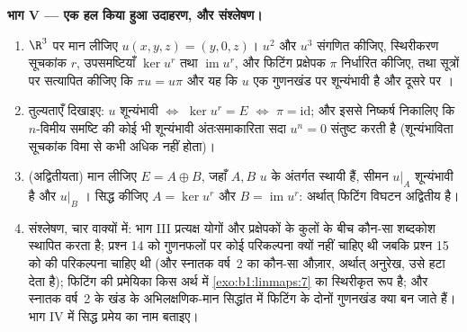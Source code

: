 \begin{problem}
\medskip \noindent\textbf{भाग V --- एक हल किया हुआ उदाहरण, और संश्लेषण।}
\begin{enumerate}[resume]
  \item $\R^3$ पर मान लीजिए $u(x, y, z) = (y, 0, z)$। $u^2$ और $u^3$ संगणित
  कीजिए, स्थिरीकरण सूचकांक $r$, उपसमष्टियाँ $\ker u^{r}$ तथा
  $\operatorname{im} u^{r}$, और फिटिंग प्रक्षेपक $\pi$ निर्धारित कीजिए, तथा
  सूत्रों पर सत्यापित कीजिए कि $\pi u = u\pi$ और यह कि $u$ एक गुणनखंड पर
  शून्यंभावी है और दूसरे पर ।
  \item तुल्यताएँ दिखाइए: $u$ शून्यंभावी $\iff$ $\ker u^{r} = E$ $\iff$ $\pi
  = \mathrm{id}$; और इससे निष्कर्ष निकालिए कि $n$-विमीय समष्टि की कोई भी
  शून्यंभावी अंतःसमाकारिता सदा $u^{n} = 0$ संतुष्ट करती है (शून्यंभाविता
  सूचकांक विमा से कभी अधिक नहीं होता)।
  \item (अद्वितीयता) मान लीजिए $E = A \oplus B$, जहाँ $A, B$ $u$ के अंतर्गत
  स्थायी हैं, सीमन $u|_A$ शून्यंभावी है और $u|_B$ । सिद्ध कीजिए
  $A = \ker u^{r}$ और $B = \operatorname{im} u^{r}$: अर्थात् फिटिंग विघटन
  अद्वितीय है।
  \item संश्लेषण, चार वाक्यों में: भाग III प्रत्यक्ष योगों और प्रक्षेपकों के
  कुलों के बीच कौन-सा शब्दकोश स्थापित करता है; प्रश्न 14 को गुणनफलों पर कोई
  परिकल्पना क्यों नहीं चाहिए थी जबकि प्रश्न 15 को  की परिकल्पना चाहिए थी
  (और स्नातक वर्ष~2 का कौन-सा औज़ार, अर्थात् अनुरेख, उसे हटा देता है);
  फिटिंग की प्रमेयिका किस अर्थ में \cref{exo:b1:linmaps:7} का स्थिरीकृत रूप
  है; और स्नातक वर्ष~2 के खंड के अभिलक्षणिक-मान सिद्धांत में फिटिंग के दोनों
  गुणनखंड क्या बन जाते हैं। भाग IV में सिद्ध प्रमेय का नाम बताइए।
\end{enumerate}
\end{problem}
